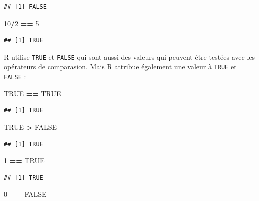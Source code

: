 \documentclass[]{book}
\newenvironment{Shaded}{\begin{snugshade}}{\end{snugshade}}
\newcommand{\DecValTok}[1]{\textcolor[rgb]{0.00,0.00,0.81}{#1}}
\newcommand{\StringTok}[1]{\textcolor[rgb]{0.31,0.60,0.02}{#1}}
\newcommand{\OtherTok}[1]{\textcolor[rgb]{0.56,0.35,0.01}{#1}}
\newcommand{\OperatorTok}[1]{\textcolor[rgb]{0.81,0.36,0.00}{\textbf{#1}}}
\begin{document}
\begin{verbatim}
## [1] FALSE
\end{verbatim}

\begin{Shaded}
\begin{Highlighting}[]
\DecValTok{10}\OperatorTok{/}\DecValTok{2} \OperatorTok{==}\StringTok{ }\DecValTok{5}
\end{Highlighting}
\end{Shaded}

\begin{verbatim}
## [1] TRUE
\end{verbatim}

R utilise \texttt{TRUE} et \texttt{FALSE} qui sont aussi des valeurs qui
peuvent être testées avec les opérateurs de comparasion. Mais R attribue
également une valeur à \texttt{TRUE} et \texttt{FALSE} :

\begin{Shaded}
\begin{Highlighting}[]
\OtherTok{TRUE} \OperatorTok{==}\StringTok{ }\OtherTok{TRUE}
\end{Highlighting}
\end{Shaded}

\begin{verbatim}
## [1] TRUE
\end{verbatim}

\begin{Shaded}
\begin{Highlighting}[]
\OtherTok{TRUE} \OperatorTok{>}\StringTok{ }\OtherTok{FALSE}
\end{Highlighting}
\end{Shaded}

\begin{verbatim}
## [1] TRUE
\end{verbatim}

\begin{Shaded}
\begin{Highlighting}[]
\DecValTok{1} \OperatorTok{==}\StringTok{ }\OtherTok{TRUE}
\end{Highlighting}
\end{Shaded}

\begin{verbatim}
## [1] TRUE
\end{verbatim}

\begin{Shaded}
\begin{Highlighting}[]
\DecValTok{0} \OperatorTok{==}\StringTok{ }\OtherTok{FALSE}
\end{Highlighting}
\end{Shaded}
\end{document}
